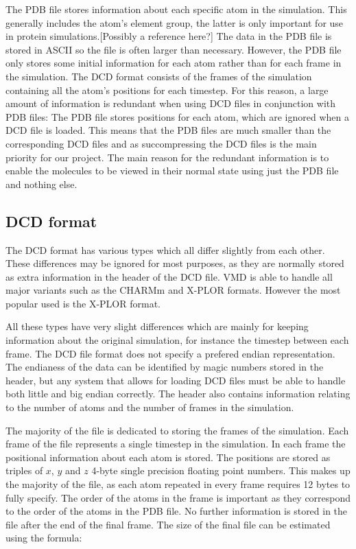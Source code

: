\documentclass[a4paper,11pt]{report}
\begin{document}
The PDB file stores information about each specific atom in the simulation. This generally includes the atom's element group, the latter is only important for use in protein simulations.[Possibly a reference here?] The data in the PDB file is stored in ASCII so the file is often larger than necessary. However, the PDB file only stores some initial information for each atom rather than for each frame in the simulation. The DCD format consists of the frames of the simulation containing all the atom's positions for each timestep. For this reason, a large amount of information is redundant when using DCD files in conjunction with PDB files: The PDB file stores positions for each atom, which are ignored when a DCD file is loaded. This means that the PDB files are much smaller than the corresponding DCD files and as succompressing the DCD files is the main priority for our project.  The main reason for the redundant information is to enable the molecules to be viewed in their normal state using just the PDB file and nothing else.

\subsection{DCD format}
The DCD format has various types which all differ slightly from each other. These differences may be ignored for most purposes, as they are normally stored as extra information in the header of the DCD file. VMD is able to handle all major variants such as the CHARMm and X-PLOR formats. However the most popular used is the X-PLOR format. \cite{vmddcdformat}

All these types have very slight differences which are mainly for keeping information about the original simulation, for instance the timestep between each frame. The DCD file format does not specify a prefered endian representation. The endianess of the data can be identified by magic numbers stored in the header, but any system that allows for loading DCD files must be able to handle both little and big endian correctly. The header also contains information relating to the number of atoms and the number of frames in the simulation.

The majority of the file is dedicated to storing the frames of the simulation. Each frame of the file represents a single timestep in the simulation. In each frame the positional information about each atom is stored. The positions are stored as triples of $x$, $y$ and $z$ 4-byte single precision floating point numbers. This makes up the majority of the file, as each atom repeated in every frame requires 12 bytes to fully specify. The order of the atoms in the frame is important as they correspond to the order of the atoms in the PDB file. No further information is stored in the file after the end of the final frame. The size of the final file can be estimated using the formula: 
\end{document}
